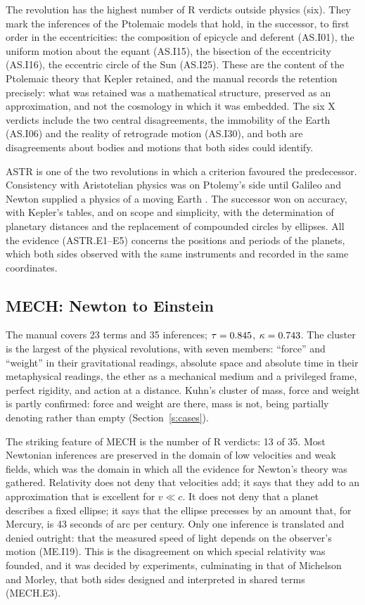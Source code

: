 \documentclass{situationist-preprint}
\begin{document}
The revolution has the highest number of R verdicts outside physics (six). They mark the inferences of the Ptolemaic models that hold, in the successor, to first order in the eccentricities: the composition of epicycle and deferent (AS.I01), the uniform motion about the equant (AS.I15), the bisection of the eccentricity (AS.I16), the eccentric circle of the Sun (AS.I25). These are the content of the Ptolemaic theory that Kepler retained, and the manual records the retention precisely: what was retained was a mathematical structure, preserved as an approximation, and not the cosmology in which it was embedded. The six X verdicts include the two central disagreements, the immobility of the Earth (AS.I06) and the reality of retrograde motion (AS.I30), and both are disagreements about bodies and motions that both sides could identify.

ASTR is one of the two revolutions in which a criterion favoured the predecessor. Consistency with Aristotelian physics was on Ptolemy's side until Galileo and Newton supplied a physics of a moving Earth \citep{Kuhn1957}. The successor won on accuracy, with Kepler's tables, and on scope and simplicity, with the determination of planetary distances and the replacement of compounded circles by ellipses. All the evidence (ASTR.E1--E5) concerns the positions and periods of the planets, which both sides observed with the same instruments and recorded in the same coordinates.

\subsection{MECH: Newton to Einstein}

The manual covers 23 terms and 35 inferences; $\tau = 0.845$, $\kappa = 0.743$. The cluster is the largest of the physical revolutions, with seven members: \enquote{force} and \enquote{weight} in their gravitational readings, absolute space and absolute time in their metaphysical readings, the ether as a mechanical medium and a privileged frame, perfect rigidity, and action at a distance. Kuhn's cluster of mass, force and weight is partly confirmed: force and weight are there, mass is not, being partially denoting rather than empty (Section~\ref{s:cases}).

The striking feature of MECH is the number of R verdicts: 13 of 35. Most Newtonian inferences are preserved in the domain of low velocities and weak fields, which was the domain in which all the evidence for Newton's theory was gathered. Relativity does not deny that velocities add; it says that they add to an approximation that is excellent for $v \ll c$. It does not deny that a planet describes a fixed ellipse; it says that the ellipse precesses by an amount that, for Mercury, is 43 seconds of arc per century. Only one inference is translated and denied outright: that the measured speed of light depends on the observer's motion (ME.I19). This is the disagreement on which special relativity was founded, and it was decided by experiments, culminating in that of Michelson and Morley, that both sides designed and interpreted in shared terms (MECH.E3).
\end{document}
